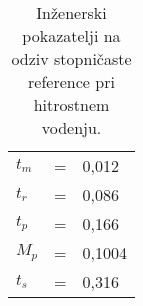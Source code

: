 
\begin{table}[!h]
	\centering
	\begin{footnotesize}
		\begin{tabular}{|l c l|}
		\hline
		$ t_m $ & = & 0,012 \\
		$ t_r $ & = & 0,086 \\
		$ t_p $ & = & 0,166 \\
		$ M_p $ & = & 0,1004 \\
		$ t_s $ & = & 0,316 \\
		\hline
		\end{tabular}
	\end{footnotesize}
	\caption{Inženerski pokazatelji na odziv stopničaste reference pri hitrostnem vodenju.}
	\label{table:vel_stepy}
\end{table}
